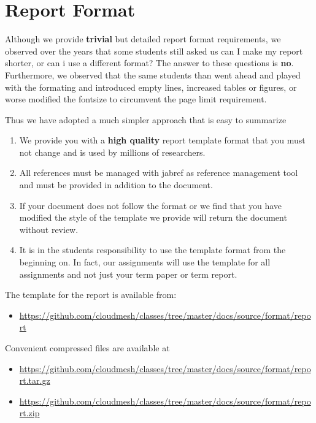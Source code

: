\FILENAME

\section{Report Format}\label{report-format}

Although we provide \textbf{trivial} but detailed report format
requirements, we observed over the years that some students still asked
us can I make my report shorter, or can i use a different format? The
answer to these questions is \textbf{no}. Furthermore, we observed that
the same students than went ahead and played with the formating and
introduced empty lines, increased tables or figures, or worse modified
the fontsize to circumvent the page limit requirement.

Thus we have adopted a much simpler approach that is easy to summarize

\begin{enumerate}
\def\labelenumi{\arabic{enumi}.}

\item
  We provide you with a \textbf{high quality} report template format
  that you must not change and is used by millions of researchers.
\item
  All references must be managed with jabref as reference management
  tool and must be provided in addition to the document.
\item
  If your document does not follow the format or we find that you have
  modified the style of the template we provide will return the document
  without review.
\item
  It is in the students responsibility to use the template format from
  the beginning on. In fact, our assignments will use the template for
  all assignments and not just your term paper or term report.
\end{enumerate}

The template for the report is available from:

\begin{itemize}

\item
  \url{https://github.com/cloudmesh/classes/tree/master/docs/source/format/report}
\end{itemize}

Convenient compressed files are available at

\begin{itemize}

\item
  \url{https://github.com/cloudmesh/classes/tree/master/docs/source/format/report.tar.gz}
\item
  \url{https://github.com/cloudmesh/classes/tree/master/docs/source/format/report.zip}
\end{itemize}

